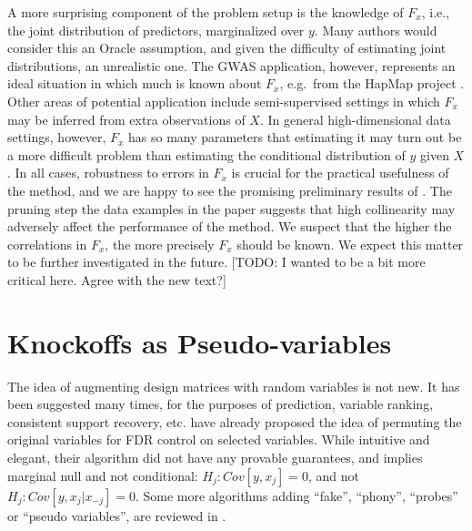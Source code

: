 \documentclass[article,lineno]{biometrika}
\begin{document}
A more surprising component of the problem setup is the knowledge of $F_x$, i.e., the joint distribution of predictors, marginalized over $y$.
Many authors would consider this an Oracle assumption, and given the difficulty of estimating joint distributions, an unrealistic one.
The GWAS application, however, represents an ideal situation in which much is known about $F_x$, e.g.\ from the HapMap project \citep{Hapmap2003}.
Other areas of potential application include semi-supervised settings in which $F_x$ may be inferred from extra observations of $X$. 
In general high-dimensional data settings, however, $F_x$ has so many parameters that estimating it may turn out be a more difficult problem than estimating the conditional distribution of $y$ given $X$.
In all cases, robustness to errors in $F_x$ is crucial for the practical usefulness of the method, and we are happy to see the promising preliminary results of \cite{CandesPanninggoldmodelX2018}.
The pruning step the data examples in the paper suggests that high collinearity may adversely affect the performance of the method. We suspect that the higher the correlations in $F_x$, the more precisely $F_x$ should be known.
We expect this matter to be further investigated in the future.
[TODO: I wanted to be a bit more critical here. Agree with the new text?]


\section{Knockoffs as Pseudo-variables}
The idea of augmenting design matrices with random variables is not new.
It has been suggested many times, for the purposes of prediction, variable ranking, consistent support recovery, etc.
\cite{TusherSignificanceanalysismicroarrays2001} have already proposed the idea of permuting the original variables for FDR control on selected variables.
While intuitive and elegant, their algorithm did not have any provable guarantees, and implies marginal null and not conditional: $H_j:Cov[y,x_j]=0$, and not $H_j:Cov[y,x_j|x_{-j}]=0$.
Some more algorithms adding ``fake'', ``phony'', ``probes'' or ``pseudo variables'', are reviewed in \cite{GuyonIntroductionVariableFeature2003}.
\end{document}
